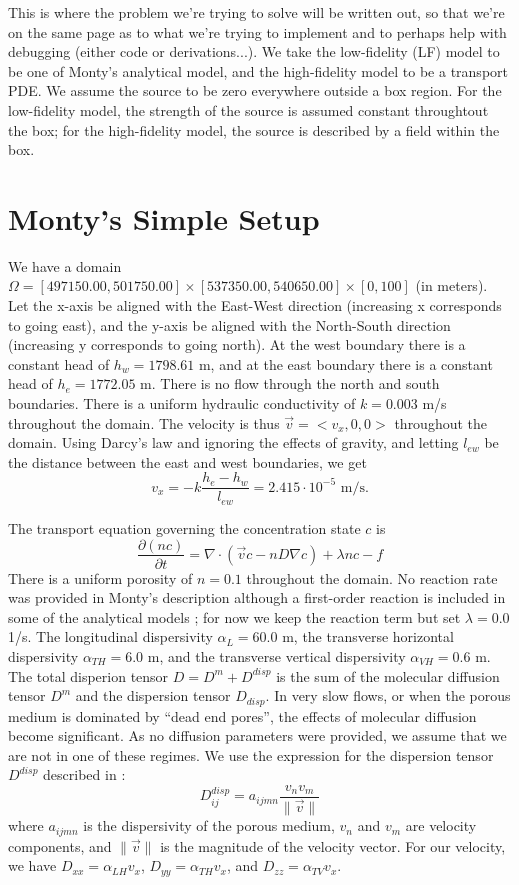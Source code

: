 \documentclass[12pt, letterpaper]{article}
\begin{document}
This is where the problem we're trying to solve will be written out, so that we're on the same page as to what we're trying to implement and to perhaps help with debugging (either code or derivations...). We take the low-fidelity (LF) model to be one of Monty's analytical model, and the high-fidelity model to be a transport PDE. We assume the source to be zero everywhere outside a box region. For the low-fidelity model, the strength of the source is assumed constant throughtout the box; for the high-fidelity model, the source is described by a field within the box. 

\section{Monty's Simple Setup}

We have a domain $\Omega=[497150.00, 501750.00]\times[537350.00, 540650.00]\times[0,100]$ (in meters). Let the x-axis be aligned with the East-West direction (increasing x corresponds to going east), and the y-axis be aligned with the North-South direction (increasing y corresponds to going north). At the west boundary there is a constant head of $h_w=1798.61$ m, and at the east boundary there is a constant head of $h_e=1772.05$ m. There is no flow through the north and south boundaries. There is a uniform hydraulic conductivity of $k=0.003$ m/s throughout the domain. The velocity is thus $\vec{v}=<v_x,0,0>$ throughout the domain. Using Darcy's law and ignoring the effects of gravity, and letting $l_{ew}$ be the distance between the east and west boundaries, we get
\[
v_x=-k\frac{h_e-h_w}{l_{ew}}=2.415\cdot10^{-5}\textrm{ m/s}.
\]

The transport equation governing the concentration state $c$ is
\[
\frac{\partial (nc)}{\partial t}=\nabla\cdot(\vec{v}c-nD\nabla c)+\lambda n c - f
\]
There is a uniform porosity of $n=0.1$ throughout the domain. No reaction rate was provided in Monty's description although a first-order reaction is included in some of the analytical models \cite{}; for now we keep the reaction term but set $\lambda=0.0$ 1/s. The longitudinal dispersivity $\alpha_L=60.0$ m, the transverse horizontal dispersivity $\alpha_{TH}=6.0$ m, and the transverse vertical dispersivity $\alpha_{VH}=0.6$ m. The total disperion tensor $D=D^m+D^{disp}$ is the sum of the molecular diffusion tensor $D^m$ and the dispersion tensor $D_{disp}$. In very slow flows, or when the porous medium is dominated by ``dead end pores'', the effects of molecular diffusion become significant. As no diffusion parameters were provided, we assume that we are not in one of these regimes. We use the expression for the dispersion tensor $D^{disp}$ described in \cite{}:
\[
D^{disp}_{ij}=a_{ijmn}\frac{v_n v_m}{\|\vec{v}\|}
\]
where $a_{ijmn}$ is the dispersivity of the porous medium, $v_n$ and $v_m$ are velocity components, and $\|\vec{v}\|$ is the magnitude of the velocity vector. For our velocity, we have $D_{xx}=\alpha_{LH}v_x$, $D_{yy}=\alpha_{TH}v_x$, and $D_{zz}=\alpha_{TV}v_x$. 
\end{document}
